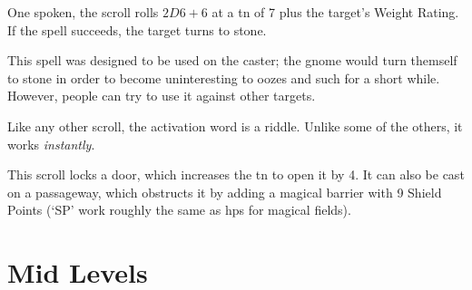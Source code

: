 \begin{multicols}{2}
\begin{itemize}
\end{itemize}

One spoken, the scroll rolls $2D6+6$ at a \gls{tn} of 7 plus the target's Weight Rating.
If the spell succeeds, the target turns to stone.

This spell was designed to be used on the caster; the gnome would turn themself to stone in order to become uninteresting to oozes and such for a short while.
However, people can try to use it against other targets.

Like any other scroll, the activation word is a riddle.
Unlike some of the others, it works \emph{instantly}.


This scroll locks a door, which increases the \gls{tn} to open it by 4.
It can also be cast on a passageway, which obstructs it by adding a magical barrier with 9 Shield Points (`SP' work roughly the same as \glspl{hp} for magical fields).

\end{multicols}

\section{Mid Levels}

